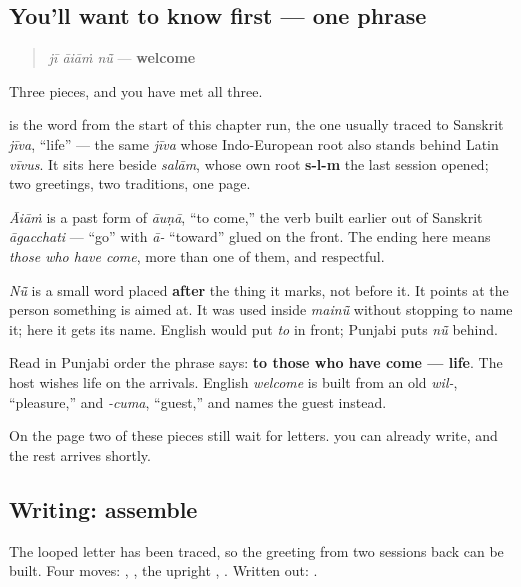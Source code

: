 \subsection*{You'll want to know first — one phrase}
\begin{quote}
\emph{jī āiāṁ nū̃} — \textbf{welcome}
\end{quote}

\begin{cousinweb}
Three pieces, and you have met all three.

\textbf{} is the word from the start of this chapter run, the one usually traced to Sanskrit \emph{jīva}, \textquotedblleft{}life\textquotedblright{} — the same \emph{jīva} whose Indo-European root also stands behind Latin \emph{vīvus}. It sits here beside \emph{salām}, whose own root \textbf{s-l-m} the last session opened; two greetings, two traditions, one page.

\emph{Āiāṁ} is a past form of \emph{āuṇā}, \textquotedblleft{}to come,\textquotedblright{} the verb built earlier out of Sanskrit \emph{āgacchati} — \textquotedblleft{}go\textquotedblright{} with \emph{ā-} \textquotedblleft{}toward\textquotedblright{} glued on the front. The ending here means \emph{those who have come}, more than one of them, and respectful.

\emph{Nū̃} is a small word placed \textbf{after} the thing it marks, not before it. It points at the person something is aimed at. It was used inside \emph{mainū̃} without stopping to name it; here it gets its name. English would put \emph{to} in front; Punjabi puts \emph{nū̃} behind.

Read in Punjabi order the phrase says: \textbf{to those who have come — life}. The host wishes life on the arrivals. English \emph{welcome} is built from an old \emph{wil-}, \textquotedblleft{}pleasure,\textquotedblright{} and \emph{-cuma}, \textquotedblleft{}guest,\textquotedblright{} and names the guest instead.

On the page two of these pieces still wait for letters. \textbf{} you can already write, and the rest arrives shortly.
\end{cousinweb}

\subsection*{Writing: assemble }
The looped letter has been traced, so the greeting from two sessions back can be built. Four moves: \textbf{}, \textbf{}, the upright \textbf{}, \textbf{}. Written out: \textbf{}.

